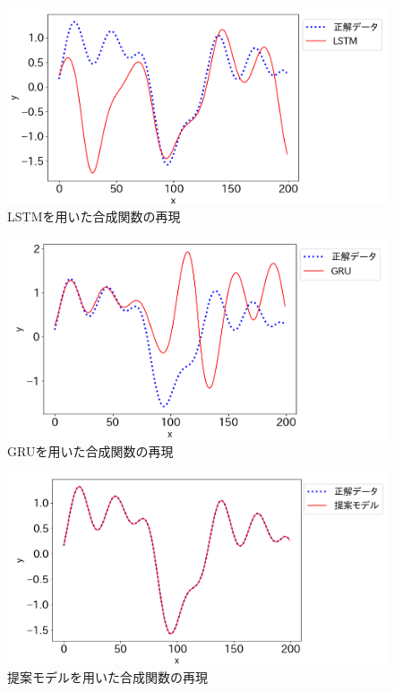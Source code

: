 \begin{figure}[htp]
  \begin{center}
    \includegraphics[width=14cm]{./fig/lstm}
    \caption{LSTMを用いた合成関数の再現}
    \label{fig:lstm_experiment2}
  \end{center}
\end{figure}

\begin{figure}[hp]
  \begin{center}
    \includegraphics[width=14cm]{./fig/gru}
    \caption{GRUを用いた合成関数の再現}
    \label{fig:gru_experiment2}
  \end{center}
\end{figure}

\begin{figure}[ht]
  \begin{center}
    \includegraphics[width=14cm]{./fig/ihtm}
    \caption{提案モデルを用いた合成関数の再現}
    \label{fig:ihtm_experiment2}
  \end{center}
\end{figure}

